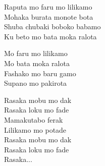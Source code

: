 \begin{lyrics}
Raputa mo faru mo lilikamo\\
Mohaka burata monote bota\\
Shuba chubaki boboko babamo\\
Ku beto mo bata moka ralota

Mo faru mo lilikamo\\
Mo bata moka ralota\\
Fashako mo baru gamo\\
Supano mo pakirota

Rasaka mobu mo dak\\
Rasaka loku mo fade\\
Mamakutabo ferak\\
Lilikamo mo potade\\
Rasaka mobu mo dak\\
Rasaka loku mo fade\\
Rasaka...
\end{lyrics}

